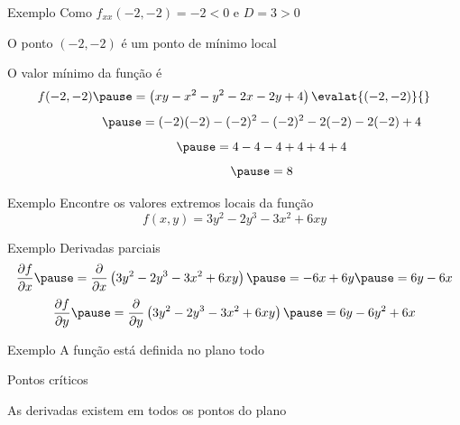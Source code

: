 \begin{frame}{Exemplo \theexemplo}
  Como \(f_{xx}(-2, -2) = -2 < 0\)
  \pause
  e \(D=3>0\)

  \pause
  \vspace{\baselineskip}
  O ponto \((-2, -2)\) é um ponto de mínimo local

  \pause
  \vspace{\baselineskip}
  O valor mínimo da função é
  \[
    f(-2, -2)
    \pause
    = \left(xy -x^2 - y^2 -2x -2y +4\right)\evalat{(-2, -2)}{}
  \]
  \[
    \hphantom{f(-2, -2)}
    \pause
    = (-2)(-2) - (-2)^2 - (-2)^2 -2(-2) -2(-2) + 4
  \]
  \[
    \hphantom{f(-2, -2)}
    \pause
    = 4 -4 -4 +4 +4 + 4
  \]
  \[
    \hphantom{f(-2, -2)}
    \pause
    = 8
  \]
\end{frame}

\addtocounter{exemplo}{1}
\begin{frame}{Exemplo \theexemplo}
  Encontre os valores extremos locais da função
  \[
    f(x, y) = 3y^2 -2y^3 -3x^2 +6xy
  \]
\end{frame}

\begin{frame}{Exemplo \theexemplo}
  Derivadas parciais
  \pause
  \vspace{\baselineskip}
  \[
    \D{f}{x}
    \pause
    = \D{}{x}\left(3y^2 -2y^3 -3x^2 +6xy\right)
    \pause
    = -6x +6y
    \pause
    = 6y -6x
  \]
  \pause
  \vspace{\baselineskip}
  \[
    \D{f}{y}
    \pause
    = \D{}{y}\left(3y^2 -2y^3 -3x^2 +6xy\right)
    \pause
    = 6y -6y^2 +6x
  \]
\end{frame}

\begin{frame}{Exemplo \theexemplo}
  A função está definida no plano todo

  \pause
  \vspace{\baselineskip}
  Pontos críticos

  \pause
  \vspace{\baselineskip}
  As derivadas existem em todos os pontos do plano
\end{frame}


